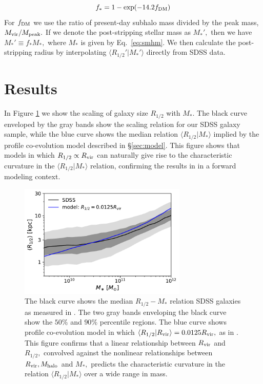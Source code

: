 \documentclass[usenatbib,usegraphicx,letterpaper]{mn2e}
\newcommand{\beq}{\begin{equation}}
\newcommand{\eeq}{\end{equation}}
\newcommand{\rhalf}{R_{1/2}}
\newcommand{\mstar}{M_{\ast}}
\newcommand{\mhalo}{M_{\rm halo}}
\newcommand{\rvir}{R_{\rm vir}}
\begin{document}
\beq
f_{\ast} = 1 - \exp(-14.2f_{\rm DM})
\eeq
For $f_{\rm DM}$ we use the ratio of present-day subhalo mass divided by the peak mass, $M_{\rm vir}/M_{\rm peak}.$ If we denote the post-stripping stellar mass as $M_{\ast}',$ then we have $M_{\ast}'\equiv f_{\ast}M_{\ast},$ where $M_{\ast}$ is given by Eq.~\ref{eq:smhm}. We then calculate the post-stripping radius by interpolating $\langle\rhalf'\vert\mstar'\rangle$ directly from SDSS data.

\section{Results}
\label{sec:results}

In Figure \ref{fig:scatter_plot} we show the scaling of galaxy size $\rhalf$ with $\mstar.$ The black curve enveloped by the gray bands show the scaling relation for our SDSS galaxy sample, while the blue curve shows the median relation $\langle\rhalf\vert\mstar\rangle$ implied by the profile co-evolution model described in \S\ref{sec:model}. This figure shows that models in which $\rhalf\propto\rvir$ can naturally give rise to the characteristic curvature in the $\langle\rhalf\vert\mstar\rangle$ relation, confirming the results in \citet{kravtsov13} in a forward modeling context.

\begin{figure}
\centering
\includegraphics[width=8cm]{FIGS/rhalf_vs_mstar_fiducial_model.pdf}
\caption{The black curve shows the median $\rhalf-\mstar$ relation SDSS galaxies as measured in \citet{meert_etal15}. The two gray bands enveloping the black curve show the $50\%$ and $90\%$ percentile regions. The blue curve shows profile co-evolution model in which $\langle\rhalf\vert\rvir\rangle=0.0125\rvir,$ as in \citet{kravtsov13}. This figure confirms that a linear relationship between $\rvir$ and $\rhalf,$ convolved against the nonlinear relationships between $\rvir, \mhalo$ and $\mstar,$  predicts the characteristic curvature in the relation $\langle\rhalf\vert\mstar\rangle$ over a wide range in mass.
}
\label{fig:scatter_plot}
\end{figure}
\end{document}
